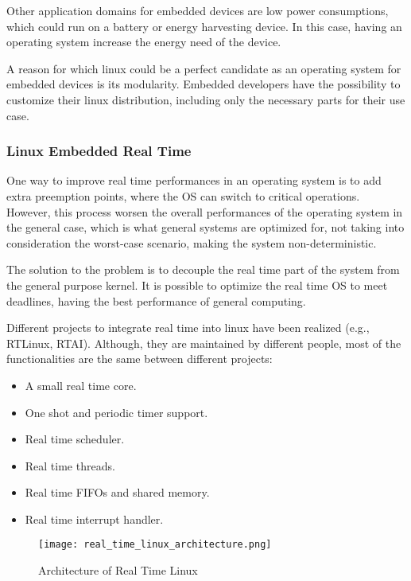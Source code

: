 Other application domains for embedded devices are low power consumptions,
which could run on a battery or energy harvesting device. In this case, having
an operating system increase the energy need of the device.

A reason for which linux could be a perfect candidate as an operating system
for embedded devices is its modularity. Embedded developers have the
possibility to customize their linux distribution, including only the necessary
parts for their use case. \cite{linux_embedded_ubuntu}

\subsubsection{Linux Embedded Real Time}

One way to improve real time performances in an operating system is to add
extra preemption points, where the OS can switch to critical operations.
However, this process worsen the overall performances of the operating system
in the general case, which is what general systems are optimized for, not
taking into consideration the worst-case scenario, making the system
non-deterministic. 

The solution to the problem is to decouple the real time part of the system
from the general purpose kernel.
It is possible to optimize the real time OS to meet deadlines, having the best
performance of general computing. \cite{linux_real_time} 

Different projects to integrate real time into linux have been realized
(e.g., RTLinux, RTAI).
Although, they are maintained by different people, most of the functionalities
are the same between different projects:

\begin{itemize}
    \item A small real time core.
    \item One shot and periodic timer support.
    \item Real time scheduler.
    \item Real time threads.
    \item Real time FIFOs and shared memory.
    \item Real time interrupt handler.
\end{itemize}

\begin{figure}[h]
    \centering
    \texttt{[image: real\_time\_linux\_architecture.png]}
    \caption{Architecture of Real Time Linux}
    \label{fig:real_time_linux_architecture}
\end{figure}

